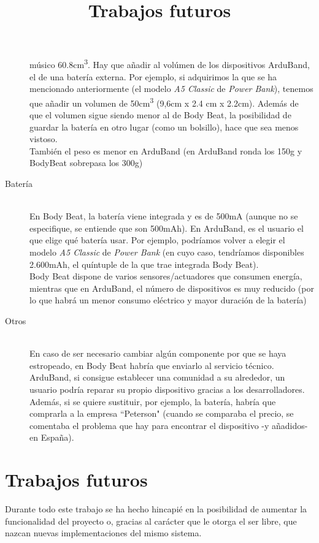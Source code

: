 \begin{description}
    músico 60.8cm\textsuperscript{3}. Hay que añadir al volúmen de los dispositivos ArduBand, el de una batería externa. Por
    ejemplo, si adquirimos la que se ha mencionado anteriormente (el modelo \textit{A5 Classic} de \textit{Power Bank}), tenemos
    que añadir un volumen de 50cm\textsuperscript{3} (9,6cm x 2.4 cm x 2.2cm). Además de que el volumen sigue siendo menor
    al de Body Beat,  la posibilidad de guardar la batería en otro lugar (como un bolsillo), hace que sea menos vistoso.\\
    También el peso es menor en ArduBand (en ArduBand ronda los 150g y BodyBeat sobrepasa los 300g)
  \item[Batería] \hfill \\
    En Body Beat, la batería viene integrada y es de 500mA (aunque no se especifique, se entiende que son 500mAh). En ArduBand,
    es el usuario el que elige qué batería usar. Por ejemplo, podríamos volver a elegir el modelo \textit{A5 Classic}
    de \textit{Power Bank} (en cuyo caso, tendríamos disponibles 2.600mAh, el quíntuple de la que trae integrada Body
    Beat).\\
    Body Beat dispone de varios sensores/actuadores que consumen energía, mientras que en ArduBand, el número
    de dispositivos es muy reducido (por lo que habrá un menor consumo eléctrico y mayor duración
    de la batería)
  \item[Otros] \hfill \\
    En caso de ser necesario cambiar algún componente por que se haya estropeado, en Body Beat habría que enviarlo
    al servicio técnico. ArduBand, si consigue establecer una comunidad a su alrededor, un usuario podría reparar
    su propio dispositivo gracias a los desarrolladores. Además, si se quiere sustituir, por ejemplo, la batería,
    habría que comprarla a la empresa ``Peterson" (cuando se comparaba el precio, se comentaba el problema que hay
    para encontrar el dispositivo -y añadidos- en España).
\end{description}



\section{Trabajos futuros}
\title{Trabajos futuros}
Durante todo este trabajo se ha hecho hincapié en la posibilidad de aumentar la
funcionalidad del proyecto o, gracias al carácter que le otorga el ser libre,
que nazcan nuevas implementaciones del mismo sistema.\\

